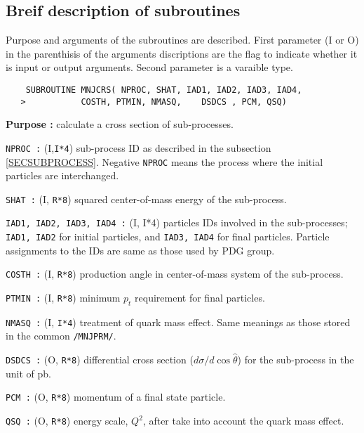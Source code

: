 %
%

\subsection{Breif description of subroutines}
Purpose and arguments of the subroutines are described.
First parameter (I or O) in the parenthisis of the arguments discriptions
are the flag to indicate 
whether it is input or output arguments.  Second parameter
is a varaible type. 
\newlength{\MNJCRS}
\settowidth{\MNJCRS}{\tt xSUBROUTINE MNJCRS( NPROC, SHAT, IAD1, IAD2, IAD3, IAD4,}
\begin{verbatim} 
    SUBROUTINE MNJCRS( NPROC, SHAT, IAD1, IAD2, IAD3, IAD4,
   >           COSTH, PTMIN, NMASQ,    DSDCS , PCM, QSQ)
\end{verbatim}
\vspace*{-42pt}
\hspace*{3ex}\fbox{\rule[28pt]{\MNJCRS}{0cm}}
\begin{list}{ }{\parsep=0pt \itemsep=0pt \topsep=0pt }
\item[\bf Purpose :] calculate a cross section of sub-processes.
\item[\tt NPROC :] (I,{\tt I*4}) sub-process ID as described in the 
subsection \ref{SECSUBPROCESS}. 
Negative {\tt NPROC} means the process where the initial particles
are interchanged.
\item[\tt SHAT :] (I, {\tt R*8}) squared center-of-mass energy of the sub-process.
\item[\tt  IAD1, IAD2, IAD3, IAD4 :] (I, {I*4}) particles IDs involved
in the sub-processes; {\tt IAD1, IAD2} for initial particles,
and {\tt IAD3, IAD4} for final particles. Particle assignments to the
IDs are same as those used by PDG group\cite{PDG}.  
\item[\tt COSTH :] (I, {\tt R*8}) production angle in center-of-mass
system of the sub-process.
\item[\tt PTMIN :] (I, {\tt R*8}) minimum $p_t$ requirement for final particles.
\item[\tt  NMASQ :] (I, {\tt I*4}) treatment of quark mass effect.
Same meanings as those stored in the common {\tt /MNJPRM/}.
\item[\tt DSDCS :] (O, {\tt R*8}) differential cross section 
($d\sigma/d\cos\hat{\theta}$) for the sub-process in the unit of pb.
\item[\tt PCM :] (O, {\tt R*8}) momentum of a final state particle.
\item[\tt QSQ :] (O, {\tt R*8}) energy scale, $Q^2$, after take into
account the quark mass effect.
\end{list}

